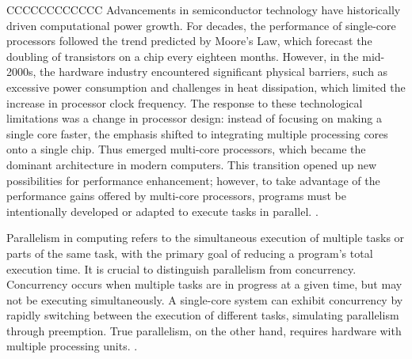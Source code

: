 

CCCCCCCCCCCC Advancements in semiconductor technology have historically driven computational power growth. For decades, the performance of single-core processors followed the trend predicted by Moore's Law, which forecast the doubling of transistors on a chip every eighteen months. However, in the mid-2000s, the hardware industry encountered significant physical barriers, such as excessive power consumption and challenges in heat dissipation, which limited the increase in processor clock frequency. The response to these technological limitations was a change in processor design: instead of focusing on making a single core faster, the emphasis shifted to integrating multiple processing cores onto a single chip. Thus emerged multi-core processors, which became the dominant architecture in modern computers. This transition opened up new possibilities for performance enhancement; however, to take advantage of the performance gains offered by multi-core processors, programs must be intentionally developed or adapted to execute tasks in parallel. \cite{Pacheco2011}.


Parallelism in computing refers to the simultaneous execution of multiple tasks or parts of the same task, with the primary goal of reducing a program's total execution time. It is crucial to distinguish parallelism from concurrency. Concurrency occurs when multiple tasks are in progress at a given time, but may not be executing simultaneously. A single-core system can exhibit concurrency by rapidly switching between the execution of different tasks, simulating parallelism through preemption. True parallelism, on the other hand, requires hardware with multiple processing units. \cite{Butenhof1997}.


